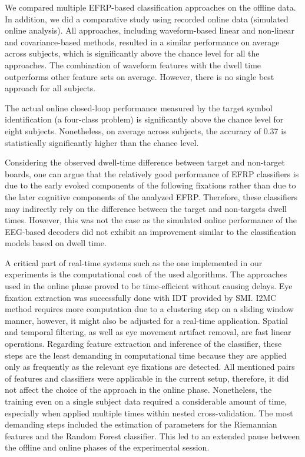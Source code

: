 \documentclass[12pt]{iopart}
\begin{document}

We compared multiple EFRP-based classification approaches on the offline data. In addition, 
we did a comparative study using recorded online data (simulated online analysis).
All approaches, including waveform-based linear and non-linear and covariance-based 
methods, resulted in a similar performance on average across subjects,
which is significantly above the chance level for all the approaches.
The combination of waveform features with the dwell time outperforms
other feature sets on average.
However, there is no single best approach for all subjects.

The actual online closed-loop performance measured by the target symbol identification (a four-class problem)
is significantly above the chance level for eight subjects.
Nonetheless, on average across subjects, the accuracy of 0.37 is 
statistically significantly higher than the chance level.

Considering the observed dwell-time difference between target and non-target boards, one can argue that the relatively good performance of EFRP classifiers is due to the early evoked components of the following fixations rather than due to the later cognitive components of the analyzed EFRP. Therefore, these classifiers
may indirectly rely on the difference between the target and non-targets dwell times.
However, this was not the case as the simulated online performance of the EEG-based
decoders did not exhibit an improvement similar to the classification models based on
dwell time. 

A critical part of real-time systems such as the one implemented in our
experiments is the computational cost of the used algorithms.
The approaches used in the online phase proved to be time-efficient without
causing delays. Eye fixation extraction was successfully done
with IDT provided by SMI. 
I2MC method requires more computation due to a clustering step 
on a sliding window manner, however, it might also 
be adjusted for a real-time application.
Spatial and temporal filtering, as well as eye movement artifact removal,
are fast linear operations.
Regarding feature extraction and inference of the classifier,
these steps are the least demanding in computational time
because they are applied only as frequently as the relevant
eye fixations are detected. All mentioned pairs of features and classifiers
were applicable in the current setup, therefore,
it did not affect the choice of the approach in the online phase.
Nonetheless, the training even on a single subject data required 
a considerable amount of time, especially when applied multiple
times within nested cross-validation. The most demanding
steps included the estimation of parameters for the Riemannian features
and the Random Forest classifier. This led to an extended
pause between the offline and online phases of the experimental session.
\end{document}
